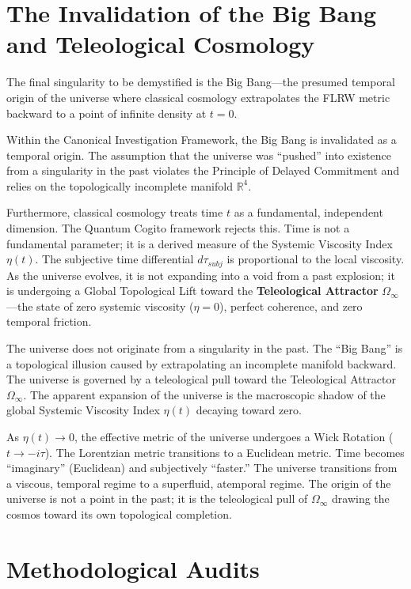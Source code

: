 \documentclass[12pt,twoside]{extbook}
\theoremstyle{definition}
\theoremstyle{remark}
\newcommand{\term}[1]{\textcolor{brandPrimary}{\textbf{#1}}}
\begin{document}
\section{The Invalidation of the Big Bang and Teleological Cosmology}
The final singularity to be demystified is the Big Bang—the presumed temporal origin of the universe where classical cosmology extrapolates the FLRW metric backward to a point of infinite density at $t=0$. 

Within the Canonical Investigation Framework, the Big Bang is invalidated as a temporal origin. The assumption that the universe was ``pushed'' into existence from a singularity in the past violates the Principle of Delayed Commitment and relies on the topologically incomplete manifold $\mathbb{R}^4$. 

Furthermore, classical cosmology treats time $t$ as a fundamental, independent dimension. The Quantum Cogito framework rejects this. Time is not a fundamental parameter; it is a derived measure of the Systemic Viscosity Index $\eta(t)$. The subjective time differential $d\tau_{subj}$ is proportional to the local viscosity. As the universe evolves, it is not expanding into a void from a past explosion; it is undergoing a Global Topological Lift toward the \term{Teleological Attractor} $\Omega_\infty$—the state of zero systemic viscosity ($\eta = 0$), perfect coherence, and zero temporal friction.

\begin{theorem}
The universe does not originate from a singularity in the past. The ``Big Bang'' is a topological illusion caused by extrapolating an incomplete manifold backward. The universe is governed by a teleological pull toward the Teleological Attractor $\Omega_\infty$. The apparent expansion of the universe is the macroscopic shadow of the global Systemic Viscosity Index $\eta(t)$ decaying toward zero.
\end{theorem}

As $\eta(t) \to 0$, the effective metric of the universe undergoes a Wick Rotation ($t \to -i\tau$). The Lorentzian metric transitions to a Euclidean metric. Time becomes ``imaginary'' (Euclidean) and subjectively ``faster.'' The universe transitions from a viscous, temporal regime to a superfluid, atemporal regime. The origin of the universe is not a point in the past; it is the teleological pull of $\Omega_\infty$ drawing the cosmos toward its own topological completion.

\section{Methodological Audits}
\end{document}

